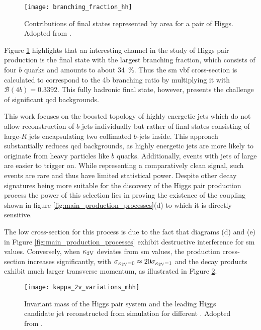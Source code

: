 \begin{figure}
    \centering
    \texttt{[image: branching\_fraction\_hh]}
    \caption[]{Contributions of final states represented by area for a pair of Higgs. Adopted from \citep{ATL-COM-PHYS-2020-083}.}
    \label{fig:branching_fraction_hh}
\end{figure}
Figure \ref{fig:branching_fraction_hh} highlights that an interesting channel in the study of Higgs pair production is the final state with the largest branching fraction, which consists of four $b$ quarks and amounts to about \qty[]{34}{\percent}. Thus the \ac{sm} \ac{vbf} cross-section is calculated to correspond to the 4b branching ratio by multiplying it with $\mathcal{B}(4b)=0.3392$. This fully hadronic final state, however, presents the challenge of significant \ac{qcd} backgrounds.

This work focuses on the boosted topology of highly energetic jets which do not allow reconstruction of $b$-jets individually but rather of final states consisting of large-$R$ jets encapsulating two collimated $b$-jets inside. This approach substantially reduces \ac{qcd} backgrounds, as highly energetic jets are more likely to originate from heavy particles like $b$ quarks. Additionally, events with jets of large \pt are easier to trigger on. While representing a comparatively clean signal, such events are rare and thus have limited statistical power. Despite other decay signatures being more suitable for the discovery of the Higgs pair production process the power of this selection lies in proving the existence of the \ktwov coupling shown in figure \ref{fig:main_production_processes}(d) to which it is directly sensitive.

The low cross-section for this process is due to the fact that diagrams (d) and (e) in Figure \ref{fig:main_production_processes} exhibit destructive interference for \ac{sm} values. Conversely, when $\kappa_{\text{2V}}$ deviates from \ac{sm} values, the production cross-section increases significantly, with $\sigma_{\kappa_{\text{2V}}=0}\approx 20\sigma_{\kappa_{\text{2V}}=1}$ and the decay products exhibit much larger transverse momentum, as illustrated in Figure \ref{fig:kappa_2v_variations_mhh}.
\begin{figure}
    \centering
    \texttt{[image: kappa\_2v\_variations\_mhh]}
    \caption[]{Invariant mass of the Higgs pair system and the leading Higgs candidate jet \pt  reconstructed from simulation for different \ktwov. Adopted from \citep{ATL-PHYS-PUB-2019-007}.}
    \label{fig:kappa_2v_variations_mhh}
\end{figure}

